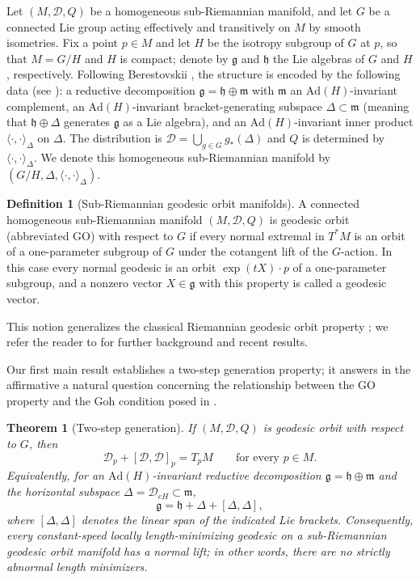 \documentclass[12pt]{amsart}
\theoremstyle{plain}
\newtheorem{theorem}{Theorem}[section]
\theoremstyle{definition}
\newtheorem{definition}{Definition}[section]
\theoremstyle{remark}
\begin{document}
Let $(M,\mathcal{D},Q)$ be a homogeneous sub-Riemannian manifold, and let $G$ be a connected Lie
group acting effectively and transitively on $M$ by smooth isometries. Fix a point $p\in M$ and
let $H$ be the isotropy subgroup of $G$ at $p$, so that $M=G/H$ and $H$ is compact; denote by
$\mathfrak{g}$ and $\mathfrak{h}$ the Lie algebras of $G$ and $H$, respectively. Following
Berestovskii \cite{Berestovskii}, the structure is encoded by the following data (see
\cite{Berestovskii,YAD}): a reductive decomposition $\mathfrak{g}=\mathfrak{h}\oplus\mathfrak{m}$
with $\mathfrak{m}$ an $\mathrm{Ad}(H)$-invariant complement, an $\mathrm{Ad}(H)$-invariant
bracket-generating subspace $\Delta\subset\mathfrak{m}$ (meaning that $\mathfrak{h}\oplus\Delta$
generates $\mathfrak{g}$ as a Lie algebra), and an $\mathrm{Ad}(H)$-invariant inner product
$\langle\cdot,\cdot\rangle_\Delta$ on $\Delta$. The distribution is
$\mathcal{D}=\bigcup_{g\in G}g_*(\Delta)$ and $Q$ is determined by $\langle\cdot,\cdot\rangle_\Delta$.
We denote this homogeneous sub-Riemannian manifold by
$(G/H,\Delta,\langle\cdot,\cdot\rangle_\Delta)$.

\begin{definition}[Sub-Riemannian geodesic orbit manifolds]\label{def:GO}
A connected homogeneous sub-Riemannian manifold $(M,\mathcal{D},Q)$ is geodesic orbit
(abbreviated GO) with respect to $G$ if every normal extremal in $T^*M$ is an orbit of a
one-parameter subgroup of $G$ under the cotangent lift of the $G$-action. In this case every
normal geodesic is an orbit $\exp(tX)\cdot p$ of a one-parameter subgroup, and a nonzero vector
$X\in\mathfrak{g}$ with this property is called a geodesic vector.
\end{definition}

This notion generalizes the classical Riemannian geodesic orbit property
\cite{Gordon96,KowalskiVanhecke}; we refer the reader to
\cite{Arvanitoyeorgos,BerestovskiiNikonorov} for further background and recent results.

Our first main result establishes a two-step generation property; it answers in the affirmative a
natural question concerning the relationship between the GO property and the Goh condition posed
in \cite[Remark 1.3]{YAD}.

\begin{theorem}[Two-step generation]\label{thm:twostep}
If $(M,\mathcal{D},Q)$ is geodesic orbit with respect to $G$, then
\[ \mathcal{D}_p+[\mathcal{D},\mathcal{D}]_p=T_pM\qquad\text{for every }p\in M. \]
Equivalently, for an $\mathrm{Ad}(H)$-invariant reductive decomposition
$\mathfrak{g}=\mathfrak{h}\oplus\mathfrak{m}$ and the horizontal subspace
$\Delta=\mathcal{D}_{eH}\subset\mathfrak{m}$,
\begin{equation}\label{eq:twostep}
\mathfrak{g}=\mathfrak{h}+\Delta+[\Delta,\Delta],
\end{equation}
where $[\Delta,\Delta]$ denotes the linear span of the indicated Lie brackets. Consequently, every
constant-speed locally length-minimizing geodesic on a sub-Riemannian geodesic orbit manifold has
a normal lift; in other words, there are no strictly abnormal length minimizers.
\end{theorem}
\end{document}
